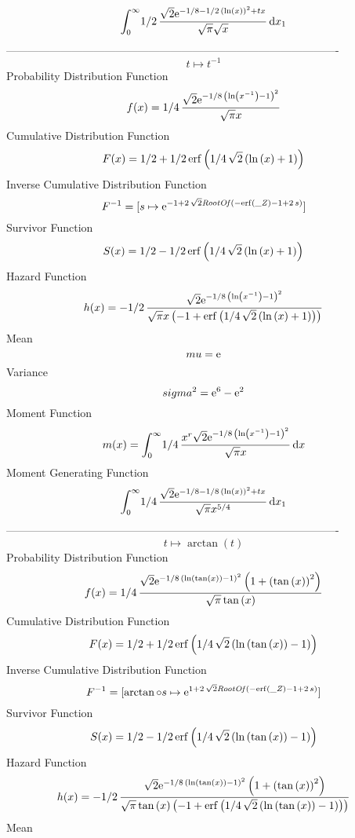 \documentclass[12pt]{article}
\begin{document}
 $$\int_{0}^{\infty }\!1/2\,{\frac {\sqrt {2}{{\rm e}^{-1/8-1/2\, \left( 
\ln  \left( x \right)  \right) ^{2}+tx}}}{\sqrt {\pi}\sqrt {x}}}
\,{\rm d}x_{{1}}
$$-------------------------------------------------------------------------------------------  \\$$t\mapsto {t}^{-1}
$$Probability Distribution Function 
$$  f(x)=1/4\,{\frac {\sqrt {2}{{\rm e}^{-1/8\, \left( \ln  \left( {x}^{-1}
 \right) -1 \right) ^{2}}}}{\sqrt {\pi}x}}
$$Cumulative Distribution Function  
 $$F(x)=1/2+1/2\,{\rm erf} \left(1/4\,\sqrt {2} \left( \ln  \left( x \right) +
1 \right) \right)
$$ Inverse Cumulative Distribution Function 
  $$F^{-1} = [s\mapsto {{\rm e}^{-1+2\,\sqrt {2}{\it RootOf} \left( -{\rm erf} 
\left({\it \_Z}\right)-1+2\,s \right) }}]
$$Survivor Function 
 $$ S(x)=1/2-1/2\,{\rm erf} \left(1/4\,\sqrt {2} \left( \ln  \left( x \right) +
1 \right) \right)
$$ Hazard Function 
 $$ h(x)=-1/2\,{\frac {\sqrt {2}{{\rm e}^{-1/8\, \left( \ln  \left( {x}^{-1}
 \right) -1 \right) ^{2}}}}{\sqrt {\pi}x \left( -1+{\rm erf} \left(1/4
\,\sqrt {2} \left( \ln  \left( x \right) +1 \right) \right) \right) }}
$$Mean 
 $$ mu={\rm e}
$$ Variance 
 $$ sigma^2 = {{\rm e}^{6}}-{{\rm e}^{2}}
$$Moment Function 
 $$ m(x) = \int_{0}^{\infty }\!1/4\,{\frac {{x}^{r}\sqrt {2}{{\rm e}^{-1/8\,
 \left( \ln  \left( {x}^{-1} \right) -1 \right) ^{2}}}}{\sqrt {\pi}x}}
\,{\rm d}x
$$ Moment Generating Function 
 $$\int_{0}^{\infty }\!1/4\,{\frac {\sqrt {2}{{\rm e}^{-1/8-1/8\, \left( 
\ln  \left( x \right)  \right) ^{2}+tx}}}{\sqrt {\pi}{x}^{5/4}}}
\,{\rm d}x_{{1}}
$$-------------------------------------------------------------------------------------------  \\$$t\mapsto \arctan \left( t \right) 
$$Probability Distribution Function 
$$  f(x)=1/4\,{\frac {\sqrt {2}{{\rm e}^{-1/8\, \left( \ln  \left( \tan \left( 
x \right)  \right) -1 \right) ^{2}}} \left( 1+ \left( \tan \left( x
 \right)  \right) ^{2} \right) }{\sqrt {\pi}\tan \left( x \right) }}
$$Cumulative Distribution Function  
 $$F(x)=1/2+1/2\,{\rm erf} \left(1/4\,\sqrt {2} \left( \ln  \left( \tan
 \left( x \right)  \right) -1 \right) \right)
$$ Inverse Cumulative Distribution Function 
  $$F^{-1} = [\arctan\circ s\mapsto {{\rm e}^{1+2\,\sqrt {2}{\it RootOf} \left( -
{\rm erf} \left({\it \_Z}\right)-1+2\,s \right) }}]
$$Survivor Function 
 $$ S(x)=1/2-1/2\,{\rm erf} \left(1/4\,\sqrt {2} \left( \ln  \left( \tan
 \left( x \right)  \right) -1 \right) \right)
$$ Hazard Function 
 $$ h(x)=-1/2\,{\frac {\sqrt {2}{{\rm e}^{-1/8\, \left( \ln  \left( \tan
 \left( x \right)  \right) -1 \right) ^{2}}} \left( 1+ \left( \tan
 \left( x \right)  \right) ^{2} \right) }{\sqrt {\pi}\tan \left( x
 \right)  \left( -1+{\rm erf} \left(1/4\,\sqrt {2} \left( \ln  \left( 
\tan \left( x \right)  \right) -1 \right) \right) \right) }}
$$Mean 
\end{document}
